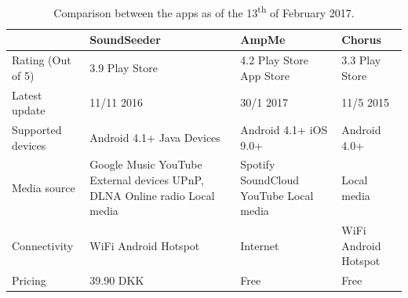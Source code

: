 \renewcommand\tabularxcolumn[1]{m{#1}}
\renewcommand{\arraystretch}{1.8}
\begin{table}
    \small
    \begin{tabularx}{\textwidth}{XXXX}\toprule
                                    & SoundSeeder                   & AmpMe                                     & Chorus                        \\\midrule
        Rating (Out of 5)           & 3.9 Play Store                & 4.2 Play Store \newline 4.0 App Store     & 3.3 Play Store                \\
        Latest update               & 11/11 2016                    & 30/1 2017                                 & 11/5 2015                     \\
        Supported \newline devices  & Android 4.1+ \newline Java Devices & Android 4.1+ \newline iOS 9.0+       & Android 4.0+                  \\
        Media source                & Google Music \newline YouTube \newline External devices \newline UPnP, DLNA \newline Online radio \newline Local media & Spotify \newline SoundCloud \newline YouTube \newline Local media & Local media \\
        Connectivity                & WiFi \newline Android Hotspot & Internet                                  & WiFi \newline Android Hotspot \\
        Pricing                     & 39.90 DKK                     & Free                                      & Free                          \\\bottomrule
    \end{tabularx}
    \caption{Comparison between the apps as of the 13\textsuperscript{th} of February 2017.}\label{tab:sota_comp}
\end{table}
